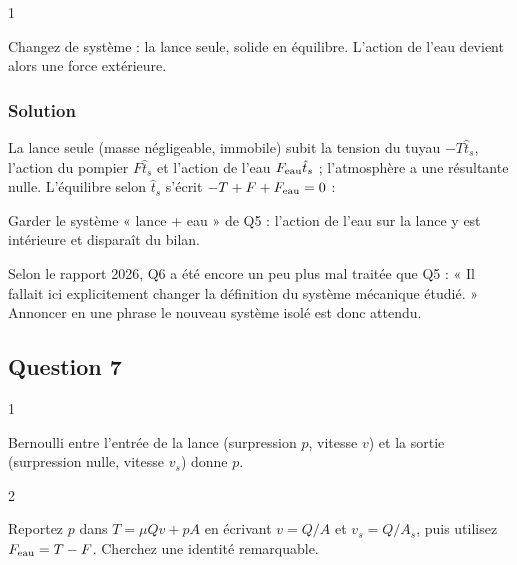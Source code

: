 \documentclass[11pt,a4paper]{article}
\newcommand{\equationajustee}[1]{%
  \sbox{\boiteequation}{$\displaystyle #1$}%
  \ifdim\wd\boiteequation>\linewidth
    \[\resizebox{\linewidth}{!}{\usebox{\boiteequation}}\]%
  \else
    \[#1\]%
  \fi}
\begin{document}
\begin{indication}{1}

Changez de système : la lance seule, solide en équilibre. L'action de l'eau devient alors une force extérieure.

\end{indication}

\hypertarget{solution-5}{%
\subsubsection{Solution}\label{solution-5}}

La lance seule (masse négligeable, immobile) subit la tension du tuyau \(-T\hat t_s\), l'action du pompier \(F\hat t_s\) et l'action de l'eau \(F_{\rm eau}\hat t_s\) ; l'atmosphère a une résultante nulle. L'équilibre selon \(\hat t_s\) s'écrit \(-T+F+F_{\rm eau}=0\) :

\equationajustee{\boxed{F_{\rm eau}=T-F}}

\begin{piege}

Garder le système « lance + eau » de Q5 : l'action de l'eau sur la lance y est intérieure et disparaît du bilan.

\end{piege}

\begin{jury}

Selon le rapport 2026, Q6 a été encore un peu plus mal traitée que Q5 : « Il fallait ici explicitement changer la définition du système mécanique étudié. » Annoncer en une phrase le nouveau système isolé est donc attendu.

\end{jury}

\hypertarget{question-7}{%
\subsection{Question 7}\label{question-7}}

\begin{indication}{1}

Bernoulli entre l'entrée de la lance (surpression \(p\), vitesse \(v\)) et la sortie (surpression nulle, vitesse \(v_s\)) donne \(p\).

\end{indication}

\begin{indication}{2}

Reportez \(p\) dans \(T=\mu Qv+pA\) en écrivant \(v=Q/A\) et \(v_s=Q/A_s\), puis utilisez \(F_{\rm eau}=T-F\). Cherchez une identité remarquable.

\end{indication}
\end{document}
